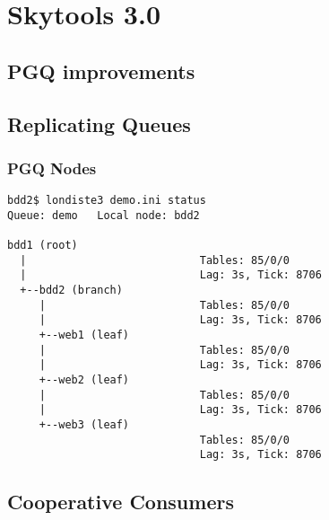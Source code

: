 \documentclass[english]{beamer}
\begin{document}
\section{Skytools 3.0}

\subsection{PGQ improvements}

\subsection{Replicating Queues}


\begin{frame}[fragile]
  \frametitle{PGQ Nodes}

  \begin{example}
\begin{verbatim}
bdd2$ londiste3 demo.ini status
Queue: demo   Local node: bdd2
 
bdd1 (root)
  |                           Tables: 85/0/0
  |                           Lag: 3s, Tick: 8706
  +--bdd2 (branch)
     |                        Tables: 85/0/0
     |                        Lag: 3s, Tick: 8706
     +--web1 (leaf)
     |                        Tables: 85/0/0
     |                        Lag: 3s, Tick: 8706
     +--web2 (leaf)
     |                        Tables: 85/0/0
     |                        Lag: 3s, Tick: 8706
     +--web3 (leaf)
                              Tables: 85/0/0
                              Lag: 3s, Tick: 8706
\end{verbatim}
  \end{example}
\end{frame}

\subsection{Cooperative Consumers}
\end{document}

